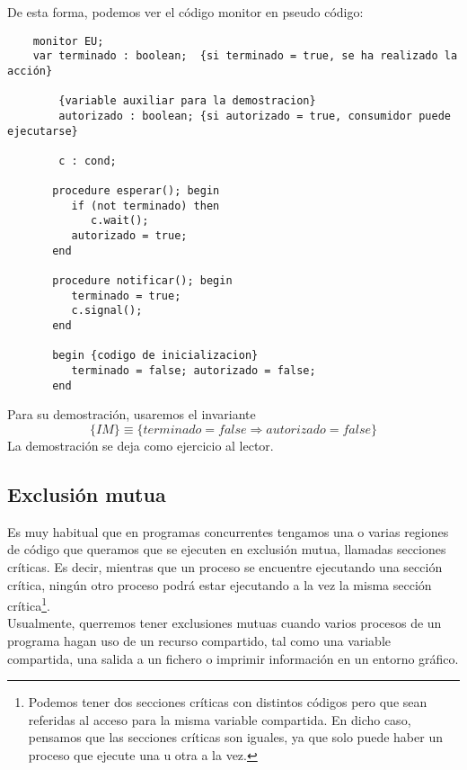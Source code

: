 De esta forma, podemos ver el código monitor en pseudo código:
\begin{verbatim}
    monitor EU;
    var terminado : boolean;  {si terminado = true, se ha realizado la acción}

        {variable auxiliar para la demostracion}
        autorizado : boolean; {si autorizado = true, consumidor puede ejecutarse}

        c : cond;

       procedure esperar(); begin
          if (not terminado) then
             c.wait();
          autorizado = true;
       end

       procedure notificar(); begin
          terminado = true; 
          c.signal();
       end

       begin {codigo de inicializacion}
          terminado = false; autorizado = false;
       end
\end{verbatim}

Para su demostración, usaremos el invariante
\begin{equation*}
    \{IM\} \equiv \{terminado = false \Longrightarrow autorizado = false\}
\end{equation*}
La demostración se deja como ejercicio al lector.

\subsection{Exclusión mutua}
Es muy habitual que en programas concurrentes tengamos una o varias regiones de código que queramos que se ejecuten en exclusión mutua, llamadas secciones críticas. Es decir, mientras que un proceso se encuentre ejecutando una sección crítica, ningún otro proceso podrá estar ejecutando a la vez la misma sección crítica\footnote{Podemos tener dos secciones críticas con distintos códigos pero que sean referidas al acceso para la misma variable compartida. En dicho caso, pensamos que las secciones críticas son iguales, ya que solo puede haber un proceso que ejecute una u otra a la vez.}.\\

Usualmente, querremos tener exclusiones mutuas cuando varios procesos de un programa hagan uso de un recurso compartido, tal como una variable compartida, una salida a un fichero o imprimir información en un entorno gráfico.

